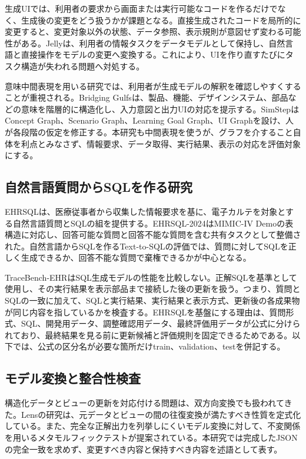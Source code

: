 \documentclass[a4paper]{jsarticle}
\begin{document}
生成UIでは、利用者の要求から画面または実行可能なコードを作るだけでなく、生成後の変更をどう扱うかが課題となる。直接生成されたコードを局所的に変更すると、変更対象以外の状態、データ参照、表示規則が意図せず変わる可能性がある。Jellyは、利用者の情報タスクをデータモデルとして保持し、自然言語と直接操作をモデルの変更へ変換する\cite{cao2025jelly}。これにより、UIを作り直すたびにタスク構造が失われる問題へ対処する。

意味中間表現を用いる研究では、利用者が生成モデルの解釈を確認しやすくすることが重視される。Bridging Gulfsは、製品、機能、デザインシステム、部品などの意味を階層的に構造化し、入力意図と出力UIの対応を提示する\cite{park2026bridging}。SimStepはConcept Graph、Scenario Graph、Learning Goal Graph、UI Graphを設け、人が各段階の仮定を修正する\cite{kaputa2026simstep}。本研究も中間表現を使うが、グラフを介すること自体を利点とみなさず、情報要求、データ取得、実行結果、表示の対応を評価対象にする。

\subsection{自然言語質問からSQLを作る研究}

EHRSQLは、医療従事者から収集した情報要求を基に、電子カルテを対象とする自然言語質問とSQLの組を提供する。EHRSQL-2024はMIMIC-IV Demoの表構造に対応し、回答可能な質問と回答不能な質問を含む共有タスクとして整備された\cite{lee2024ehrsql}。自然言語からSQLを作るText-to-SQLの評価では、質問に対してSQLを正しく生成できるか、回答不能な質問で棄権できるかが中心となる。

TraceBench-EHRはSQL生成モデルの性能を比較しない。正解SQLを基準として使用し、その実行結果を表示部品まで接続した後の更新を扱う。つまり、質問とSQLの一致に加えて、SQLと実行結果、実行結果と表示方式、更新後の各成果物が同じ内容を指しているかを検査する。EHRSQLを基盤にする理由は、質問形式、SQL、開発用データ、調整確認用データ、最終評価用データが公式に分けられており、最終結果を見る前に更新候補と評価規則を固定できるためである。以下では、公式の区分名が必要な箇所だけtrain、validation、testを併記する。

\subsection{モデル変換と整合性検査}

構造化データとビューの更新を対応付ける問題は、双方向変換でも扱われてきた。Lensの研究は、元データとビューの間の往復変換が満たすべき性質を定式化している\cite{foster2007lenses}。また、完全な正解出力を列挙しにくいモデル変換に対して、不変関係を用いるメタモルフィックテストが提案されている\cite{he2018metamorphic}。本研究では完成したJSONの完全一致を求めず、変更すべき内容と保持すべき内容を述語として表す。
\end{document}
